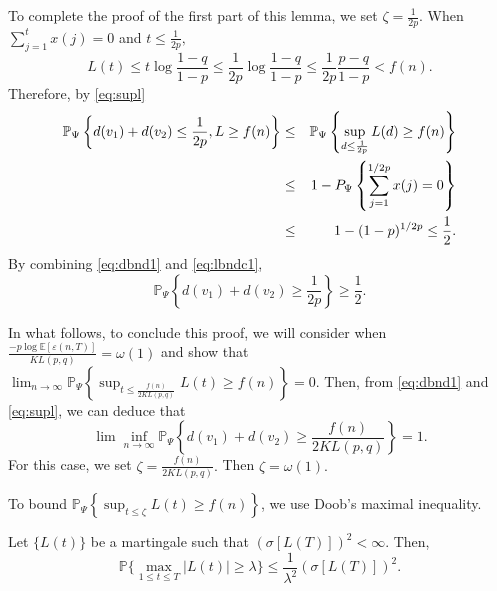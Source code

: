 To complete the proof of the first part of this lemma, we set $\zeta =\frac{1}{2p}$. When
$\sum_{j =1 }^{t} x(j) = 0$ and $t \le \frac{1}{2p},$ 
$$L(t) \le t \log \frac{1-q}{1-p} \le \frac{1}{2p} \log \frac{1-q}{1-p} \le
\frac{1}{2p}\frac{p-q}{1-p} < f(n).$$
Therefore, by \eqref{eq:supl}
\begin{eqnarray}
\mathbb{P}_{\Psi} \left\{ d(v_1)+d(v_2) \le  \frac{1}{2p}   , L\ge  f(n) \right\} &\le&
\mathbb{P}_{\Psi} \left\{ \sup_{d\le \frac{1}{2p}} L(d) \ge  f(n)
\right\}\cr & \le &1- P_{\Psi} \left\{ \sum_{j =1 }^{1/2p} x(j)  = 0  \right\} \cr &\le& 1-(1-p)^{1/2p}\le
\frac{1}{2}.\label{eq:lbndc1}
\end{eqnarray}
By combining \eqref{eq:dbnd1} and \eqref{eq:lbndc1},
$$\mathbb{P}_{\Psi} \left\{ d(v_1)+d(v_2) \ge  \frac{1}{2p} \right\}
\ge \frac{1}{2}.$$

In what follows, to conclude this proof, we will consider  when $\frac{- p \log \mathbb{E}[\varepsilon (n,T)]}{KL(p,q) }  =
\omega( 1 )$ and show that $\lim_{n \rightarrow \infty }\mathbb{P}_{\Psi} \left\{ 
\sup_{t \le \frac{f(n)}{2KL(p,q)}} L(t) \ge  f(n)\right\} = 0$.
Then, from \eqref{eq:dbnd1} and \eqref{eq:supl}, we can deduce that
$$\lim\inf_{n\to \infty}\mathbb{P}_{\Psi} \left\{ d(v_1)+d(v_2) \ge \frac{f(n)}{2KL(p,q)}  \right\}=1.$$
 For this case, we set $\zeta = \frac{f(n)}{2KL(p,q)}.$
Then $\zeta = \omega(1).$ 

To bound $\mathbb{P}_{\Psi} \left\{ \sup_{t \le \zeta} L(t) \ge  f(n)\right\}$, we use Doob's maximal inequality.
\begin{lemma} Let $\{ L(t) \}$ be a
  martingale such that $ (\sigma [L(T)])^2 < \infty$. Then,
$$\mathbb{P}\{ \max_{1\le t \le T} |L(t) | \ge \lambda \}
\le \frac{1}{\lambda^2}  (\sigma [L(T)])^2 .$$\label{lem:kolmo}
\end{lemma}

